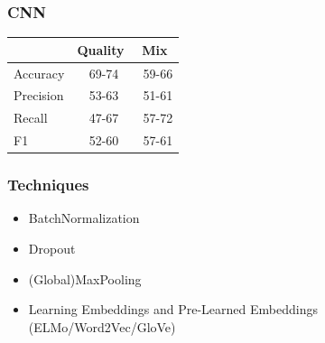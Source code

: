 \begin{frame}
    \frametitle{CNN}
    \begin{tabular}{l|c|c}
                  & Quality & Mix \\\hline
        Accuracy  & ~69-74 & ~59-66 \\
        Precision & ~53-63 & ~51-61 \\
        Recall    & ~47-67 & ~57-72 \\
        F1        & ~52-60 & ~57-61
    \end{tabular}
\end{frame}

\begin{frame}
    \frametitle{Techniques}
    \begin{itemize}
        \item BatchNormalization
        \item Dropout
        \item (Global)MaxPooling
        \item Learning Embeddings and Pre-Learned Embeddings (ELMo/Word2Vec/GloVe)
    \end{itemize}
\end{frame}

